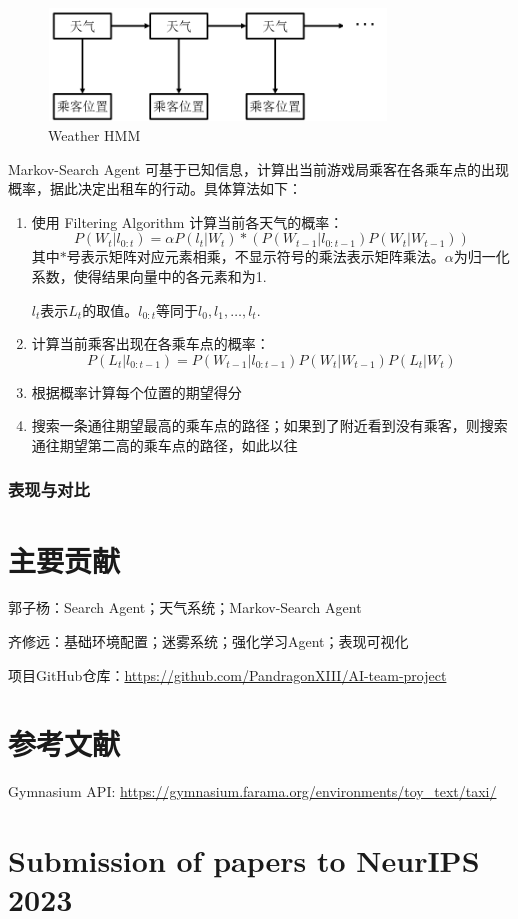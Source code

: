 \documentclass{article}
\begin{document}
\begin{CJK}{UTF8}{gbsn}
\begin{figure}[htbp]
  \centering
  \includegraphics[width=9cm,height=3cm]{images/1.png}
  \caption{Weather HMM}
\end{figure}
Markov-Search Agent 可基于已知信息，计算出当前游戏局乘客在各乘车点的出现概率，据此决定出租车的行动。具体算法如下：
\begin{enumerate}
  \item 使用 Filtering Algorithm 计算当前各天气的概率：
$$P(W_t|l_{0:t})=\alpha P(l_t|W_t)*(P(W_{t-1}|l_{0:t-1})P(W_t|W_{t-1}))$$
其中$*$号表示矩阵对应元素相乘，不显示符号的乘法表示矩阵乘法。$\alpha$为归一化系数，使得结果向量中的各元素和为1. 

$l_t$表示$L_t$的取值。$l_{0:t}$等同于$l_0,l_1,\dots,l_t$.
  \item 计算当前乘客出现在各乘车点的概率：
$$P(L_t|l_{0:t-1})=P(W_{t-1}|l_{0:t-1})P(W_t|W_{t-1})P(L_t|W_t)$$
  \item 根据概率计算每个位置的期望得分
  \item 搜索一条通往期望最高的乘车点的路径；如果到了附近看到没有乘客，则搜索通往期望第二高的乘车点的路径，如此以往
\end{enumerate}
\subsubsection{表现与对比}

\section{主要贡献}
郭子杨：Search Agent；天气系统；Markov-Search Agent 

齐修远：基础环境配置；迷雾系统；强化学习Agent；表现可视化 


项目GitHub仓库：\url{https://github.com/PandragonXIII/AI-team-project} 

\section{参考文献}
Gymnasium API: \url{https://gymnasium.farama.org/environments/toy_text/taxi/}

\section{Submission of papers to NeurIPS 2023}



\end{CJK}
\end{document}
